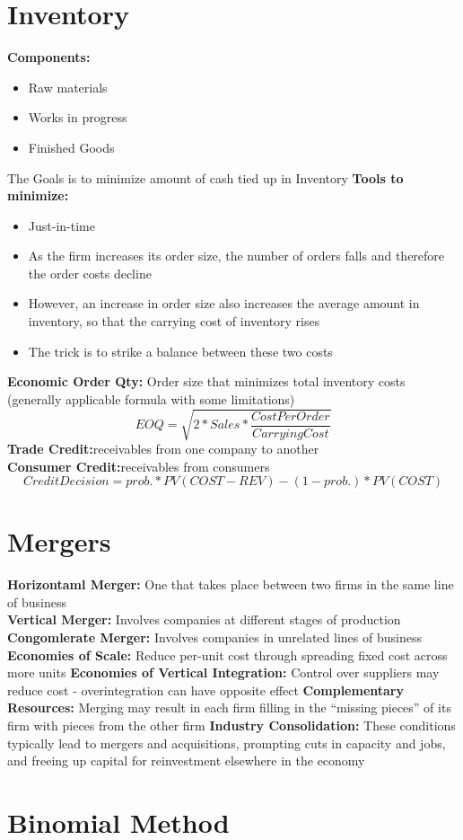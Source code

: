 \documentclass{cheatsheet}
\begin{document}
\section{Inventory}
\textbf{Components:}\begin{itemize}
  \item Raw materials
  \item Works in progress
  \item Finished Goods
\end{itemize}
The Goals is to minimize amount of cash tied up in Inventory
\textbf{Tools to minimize:}\begin{itemize}
  \item Just-in-time
  \item As the firm increases its order size, the number of orders falls and therefore the order costs decline
  \item However, an increase in order size also increases the average amount in inventory, so that the carrying cost of inventory rises
  \item The trick is to strike a balance between these two costs
\end{itemize}
\textbf{Economic Order Qty:} Order size that minimizes total inventory costs (generally applicable formula
with some limitations)
\[EOQ = \sqrt{2*Sales*\frac{CostPerOrder}{CarryingCost}}\]
\textbf{Trade Credit:}receivables from one company to another\\
\textbf{Consumer Credit:}receivables from consumers\\
\[Credit Decision = prob. * PV(COST-REV) - (1-prob.) * PV(COST)\]

\section{Mergers}
\textbf{Horizontaml Merger:} One that takes place between two firms
in the same line of business\\
\textbf{Vertical Merger:} Involves companies at different stages of production\\
\textbf{Congomlerate Merger:} Involves companies in unrelated lines of business\\
\textbf{Economies of Scale:} Reduce per-unit cost through spreading fixed cost across more units
\textbf{Economies of Vertical Integration:} Control over suppliers may reduce cost - overintegration can have opposite effect
\textbf{Complementary Resources:} Merging may result in each firm filling in the “missing pieces” of its firm with pieces from the other firm
\textbf{Industry Consolidation:} These conditions typically lead to mergers and acquisitions, prompting cuts in capacity and jobs, and freeing up capital for reinvestment elsewhere in the economy


\section*{Binomial Method}
\end{document}
